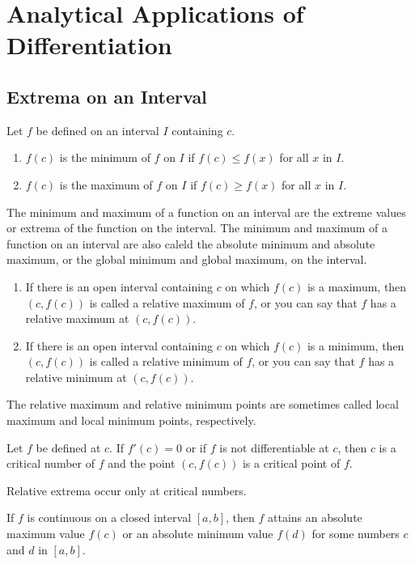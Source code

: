 \documentclass[../abcalc.tex]{subfiles}
\begin{document}
\chapter{Analytical Applications of Differentiation}
\section{Extrema on an Interval}
\begin{definition}
    Let $f$ be defined on an interval $I$ containing $c$.
    \begin{enumerate}
        \item $f(c)$ is the minimum of $f$ on $I$ if $f(c)\leq f(x)$ for all $x$ in $I$.
        \item $f(c)$ is the maximum of $f$ on $I$ if $f(c)\geq f(x)$ for all $x$ in $I$.
    \end{enumerate}
    The minimum and maximum of a function on an interval are the extreme values or extrema of the function on the interval. The minimum 
    and maximum of a function on an interval are also caleld the absolute minimum and absolute maximum, or the global minimum and global maximum, on the interval.
\end{definition}
\begin{definition}
    \begin{enumerate}
        \item If there is an open interval containing $c$ on which $f(c)$ is a maximum, then $(c,f(c))$ is called a relative maximum of $f$, 
        or you can say that $f$ has a relative maximum at $(c,f(c))$.
        \item If there is an open interval containing $c$ on which $f(c)$ is a minimum, then $(c,f(c))$ is called a relative minimum of $f$, 
        or you can say that $f$ has a relative minimum at $(c,f(c))$.
    \end{enumerate}
    The relative maximum and relative minimum points are sometimes called local maximum and local minimum points, respectively.
\end{definition}

\begin{definition}
    Let $f$ be defined at $c$. If $f'(c)=0$ or if $f$ is not differentiable at $c$, then $c$ is a critical number of $f$ and the point $(c,f(c))$ is a critical point of $f$.
\end{definition}

Relative extrema occur only at critical numbers.

\begin{theorem}
    If $f$ is continuous on a closed interval $[a,b]$, then $f$ attains an absolute maximum value $f(c)$ or an absolute minimum value $f(d)$ 
    for some numbers $c$ and $d$ in $[a,b]$.
\end{theorem}
\end{document}
